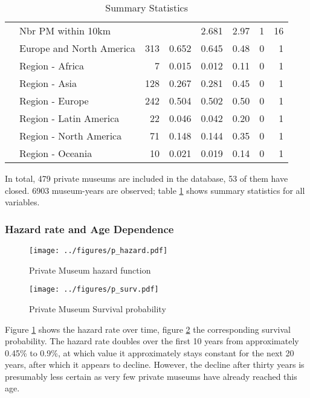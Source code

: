 \documentclass[12pt]{article}
\begin{document}
\begin{table}[ht]
\begin{tabular}{llrrrrrr}
   & Nbr PM within 10km &  &  &  2.681 &  2.97 & 1 & 16 \\ 
   & Europe and North America & 313 & 0.652 &  0.645 &  0.48 & 0 & 1 \\ 
   & Region - Africa & 7 & 0.015 &  0.012 &  0.11 & 0 & 1 \\ 
   & Region - Asia & 128 & 0.267 &  0.281 &  0.45 & 0 & 1 \\ 
   & Region - Europe & 242 & 0.504 &  0.502 &  0.50 & 0 & 1 \\ 
   & Region - Latin America & 22 & 0.046 &  0.042 &  0.20 & 0 & 1 \\ 
   & Region - North America & 71 & 0.148 &  0.144 &  0.35 & 0 & 1 \\ 
   & Region - Oceania & 10 & 0.021 &  0.019 &  0.14 & 0 & 1 \\ 
   \hline
\end{tabular}
\caption{Summary Statistics} 
\label{tbl:t_sumstats}
\end{table}

In total, 479 private museums are included in the database, 53 of them have closed.
6903 museum-years are observed; table \ref{tbl:t_sumstats} shows summary statistics for all variables.

\subsubsection*{Hazard rate and Age Dependence}


\begin{figure}[htbp]
\centering
\texttt{[image: ../figures/p\_hazard.pdf]}
\caption{\label{fig:p_hazard}Private Museum hazard function}
\end{figure}

\begin{figure}[htbp]
\centering
\texttt{[image: ../figures/p\_surv.pdf]}
\caption{\label{fig:p_surv}Private Museum Survival probability}
\end{figure}


Figure \ref{fig:p_hazard} shows the hazard rate over time, figure \ref{fig:p_surv} the corresponding survival probability.
The hazard rate doubles over the first 10 years from approximately 0.45\% to 0.9\%, at which value it approximately stays constant for the next 20 years, after which it appears to decline.
However, the decline after thirty years is presumably less certain as very few private museums have already reached this age.
\end{document}
